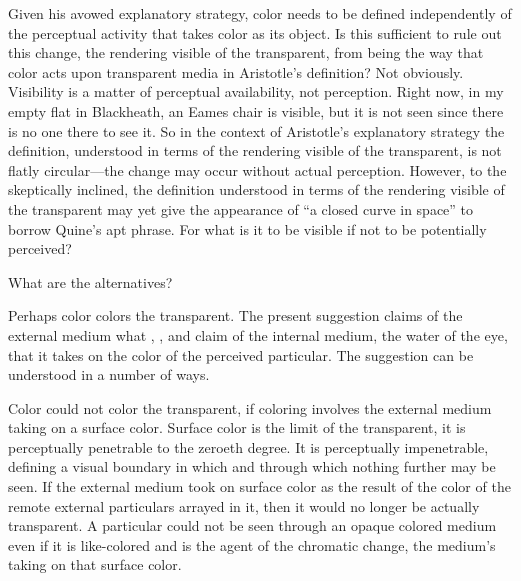 Given his avowed explanatory strategy, color needs to be defined independently of the perceptual activity that takes color as its object. Is this sufficient to rule out this change, the rendering visible of the transparent, from being the way that color acts upon transparent media in Aristotle's definition? Not obviously. Visibility is a matter of perceptual availability, not perception. Right now, in my empty flat in Blackheath, an Eames chair is visible, but it is not seen since there is no one there to see it. So in the context of Aristotle's explanatory strategy the definition, understood in terms of the rendering visible of the transparent, is not flatly circular---the change may occur without actual perception. However, to the skeptically inclined, the definition understood in terms of the rendering visible of the transparent may yet give the appearance of ``a closed curve in space'' to borrow Quine's \citeyearpar{Quine:1951fk} apt phrase. For what is it to be visible if not to be potentially perceived?

What are the alternatives? 

Perhaps color colors the transparent. The present suggestion claims of the external medium what \citet{Slakey:1961ss}, \citet{Sorabji:1974fk}, and \citet{Everson:1997ep} claim of the internal medium, the water of the eye, that it takes on the color of the perceived particular. The suggestion can be understood in a number of ways. 

Color could not color the transparent, if coloring involves the external me\-di\-um taking on a surface color. Surface color is the limit of the transparent, it is perceptually penetrable to the zeroeth degree. It is perceptually impenetrable, defining a visual boundary in which and  through which nothing further may be seen. If the external medium took on surface color as the result of the color of the remote external particulars arrayed in it, then it would no longer be actually transparent. A particular could not be seen through an opaque colored medium even if it is like-colored and is the agent of the chromatic change, the medium's taking on that surface color. 

